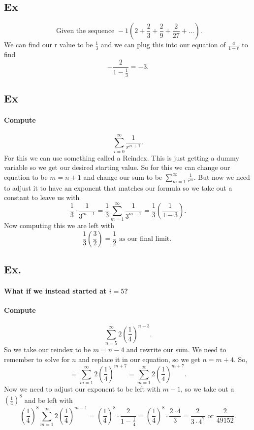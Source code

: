 \subsection{Ex}%
\label{sub:Ex}
\[
\text{ Given the sequence }-1\left( 2+\frac{ 2 }{ 3 } +\frac{ 2 }{ 9 } +\frac{ 2 }{ 27 } +\ldots \right) 
.\] 
We can find our r value to be $ \frac{ 1 }{ 3 }  $ and we can plug this into our equation of $ \frac{ a }{ 1-r } $ to find
\[
-\frac{ 2 }{ 1-\frac{ 1 }{ 3 }  } =-3
.\]

\subsection{Ex}%
\label{sub:Ex}
\paragraph{Compute}
\[
\sum_{ i=0 } ^{ \infty } \frac{ 1 }{ r^{ n+1 } }
.\] 
For this we can use something called a Reindex. This is just getting a dummy variable so we get our desired starting value. So for this we can change our equation to be $ m=n+1 $ and change our sum to be $ \sum_{ m=1 } ^{ \infty } \frac{ 1 }{ r^{ m } }  $. But now we need to adjust it to have an exponent that matches our formula so we take out a constant to leave us with
\[
\frac{ 1 }{ 3 } \cdot \frac{ 1 }{ 3^{ m-1 } } =\frac{ 1 }{ 3 } \sum_{ m=1 } ^{ \infty } \frac{ 1 }{ 3^{ m-1 } } =\frac{ 1 }{ 3 } \left( \frac{ 1 }{ 1-3 }  \right) 
.\] 
Now computing this we are left with
\[
\frac{ 1 }{ 3 } \left( \frac{ 3 }{ 2 }  \right) =\frac{ 1 }{ 2 } \text{ as our final limit. }
\] 

\subsection{Ex.}%
\label{sub:Ex.}
\paragraph{What if we instead started at $ i=5 $?}
\paragraph{Compute}
\[
\sum_{ n=5 } ^{ \infty } 2\left( \frac{ 1 }{ 4 }  \right) ^{ n+3 }
.\] 
So we take our reindex to be $ m=n-4 $ and rewrite our sum. We need to remember to solve for $ n $ and replace it in our equation, so we get $ n=m+4 $. So,
\[
=\sum_{ m=1 } ^{ \infty } 2\left( \frac{ 1 }{ 4 }  \right) ^{ m+7 }=\sum_{ m=1 } ^{ \infty } 2\left( \frac{ 1 }{ 4 }  \right) ^{ m+7 }
.\] 
Now we need to adjust our exponent to be left with $ m-1 $, so we take out a $ \left( \frac{ 1 }{ 4 }  \right) ^{ 8 } $ and be left with 
\[
	\left( \frac{ 1 }{ 4 }  \right) ^{ 8 }\sum_{ m=1 } ^{ \infty } 2\left( \frac{ 1 }{ 4 }  \right) ^{ m-1 }=\left( \frac{ 1 }{ 4 }  \right) ^{ 8 }\cdot \frac{ 2 }{ 1-\frac{ 1 }{ 4 }  } = \left( \frac{ 1 }{ 4 }  \right) ^{ 8 }\cdot \frac{ 2\cdot 4 }{ 3 }=\frac{ 2 }{ 3\cdot 4^{ 7 } } \text{ or }\frac{ 2 }{ 49152 } 
.\] 

